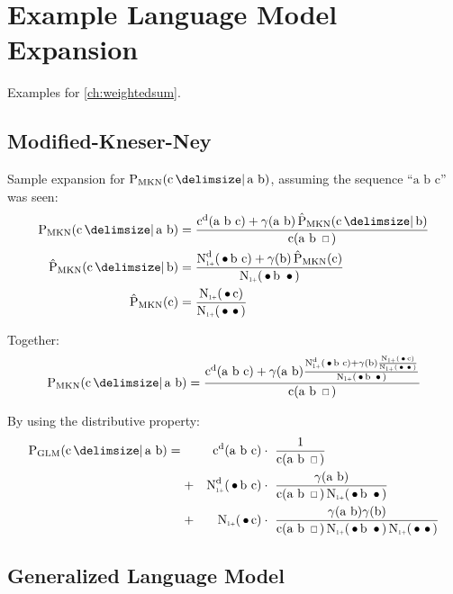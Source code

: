 \chapter{Example Language Model Expansion}
\label{app:expansion}

Examples for \cref{ch:weightedsum}.

\section{Modified-Kneser-Ney}

\newcommand{\ProbMKNcab}[1]
  {\frac{\DiscountedCount(\text{a b c}) + \gamma(\text{a b}) #1}{\Count(\text{a b \Skp})}}
\newcommand{\ProbMKNcb}[1]
  {\frac{\DiscountedCount*(\text{\WSkp b c}) + \gamma(\text{b}) #1}{\ContCountIp(\text{\WSkp b \WSkp})}}
\newcommand{\ProbMKNc}
  {\frac{\ContCountIp(\text{\WSkp c})}{\ContCountIp(\text{\WSkp \WSkp})}}

Sample expansion for $\ProbMKN{\text{c}}{\text{a b}}$, assuming the sequence
``$\text{a b c}$'' was seen:
\begin{align}
  \ProbMKN {\text{c}}{\text{a b}} &= \ProbMKNcab{\ProbMKN*{\text{c}}{\text{b}}} \\
  \ProbMKN*{\text{c}}{\text{b}}   &= \ProbMKNcb{\ProbMKN*{\text{c}}} \\
  \ProbMKN*{\text{c}}             &= \ProbMKNc
\end{align}

\noindent
Together:
\begin{equation}
  \ProbMKN {\text{c}}{\text{a b}} = \ProbMKNcab{\ProbMKNcb{\ProbMKNc}}
\end{equation}

\noindent
By using the distributive property:
\begin{align}
  \ProbGLM {\text{c}}{\text{a b}} = {}
    & & \DiscountedCount (\text{a b c})     & \cdot\ \frac{1}{\Count(\text{a b \Skp})} \\
    &+& \DiscountedCount*(\text{\WSkp b c}) & \cdot\ \frac{\gamma(\text{a b})}{\Count(\text{a b \Skp}) \ContCountIp(\text{\WSkp b \WSkp})} \nonumber \\
    &+& \ContCountIp(\text{\WSkp c})        & \cdot\ \frac{\gamma(\text{a b}) \gamma(\text{b})}{\Count(\text{a b \Skp}) \ContCountIp(\text{\WSkp b \WSkp}) \ContCountIp(\text{\WSkp \WSkp})} \nonumber
\end{align}

\clearpage
\section{Generalized Language Model}

